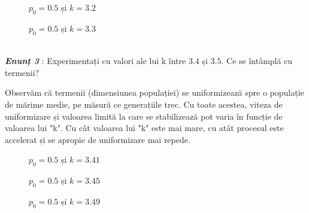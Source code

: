 \documentclass[a4paper,12pt]{article}
\begin{document}
\begin{figure}[h!]
\centering
{}
\caption{$p_0 = 0.5$ și $k=3.2$}
\end{figure}

\begin{figure}[h!]
\centering
{}
\caption{$p_0 = 0.5$ și $k=3.3$}
\end{figure}


\textit{\textbf{\\Enunț 3}} : Experimentați cu valori ale lui k între $3.4$ și $3.5$. Ce se întâmplă cu termenii?


Observăm că termenii (dimensiunea populației) se uniformizează spre o populație de mărime medie, pe măsură ce generațiile trec. Cu toate acestea, viteza de uniformizare și valoarea limită la care se stabilizează pot varia în funcție de valoarea lui "k". Cu cât valoarea lui "k" este mai mare, cu atât procesul este accelerat și se apropie de uniformizare mai repede.


\begin{figure}[h!]
\centering
{}
\caption{$p_0 = 0.5$ și $k=3.41$}
\end{figure}


\begin{figure}[h!]
\centering
{}
\caption{$p_0 = 0.5$ și $k=3.45$}
\end{figure}


\begin{figure}[h!]
\centering
{}
\caption{$p_0 = 0.5$ și $k=3.49$}
\end{figure}
\end{document}
